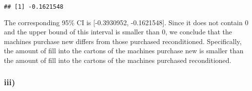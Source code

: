 \documentclass[
]{article}
\newenvironment{Shaded}{\begin{snugshade}}{\end{snugshade}}
\newcommand{\DecValTok}[1]{\textcolor[rgb]{0.00,0.00,0.81}{#1}}
\newcommand{\FloatTok}[1]{\textcolor[rgb]{0.00,0.00,0.81}{#1}}
\newcommand{\FunctionTok}[1]{\textcolor[rgb]{0.00,0.00,0.00}{#1}}
\newcommand{\NormalTok}[1]{#1}
\newcommand{\OtherTok}[1]{\textcolor[rgb]{0.56,0.35,0.01}{#1}}
\newcommand{\SpecialCharTok}[1]{\textcolor[rgb]{0.00,0.00,0.00}{#1}}
\begin{document}
\begin{verbatim}
## [1] -0.1621548
\end{verbatim}

The corresponding 95\% CI is {[}-0.3930952, -0.1621548{]}. Since it does
not contain 0 and the upper bound of this interval is smaller than 0, we
conclude that the machines purchase new differs from those purchased
reconditioned. Specifically, the amount of fill into the cartons of the
machines purchase new is smaller than the amount of fill into the
cartons of the machines purchased reconditioned.

\hypertarget{iii}{%
\subsubsection{iii)}\label{iii}}

\begin{Shaded}
\end{Shaded}
\end{document}
